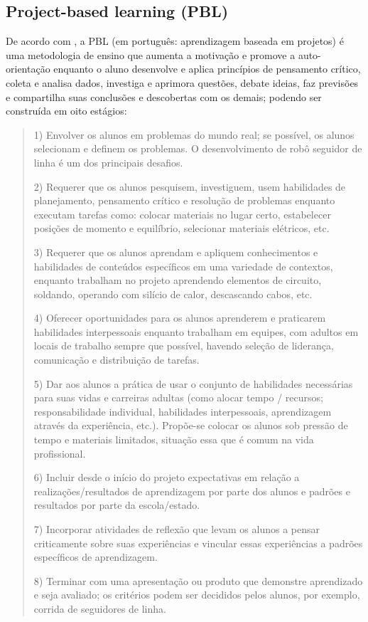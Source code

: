 \subsection{Project-based learning (PBL)}\label{sec:pbl} 
De acordo com \cite{karahoca}, a PBL (em português: aprendizagem baseada em projetos) é uma metodologia de ensino que aumenta a motivação e promove a auto-orientação enquanto o aluno desenvolve e aplica princípios de pensamento crítico, coleta e analisa dados, investiga e aprimora questões, debate ideias, faz previsões e compartilha suas conclusões e descobertas com os demais; podendo ser construída em oito estágios:
\begin{quote}
1) Envolver os alunos em problemas do mundo real; se possível, os alunos selecionam e definem os problemas. O desenvolvimento de robô seguidor de linha é um dos principais desafios.

2) Requerer que os alunos pesquisem, investiguem, usem habilidades de planejamento, pensamento crítico e resolução de problemas enquanto executam tarefas como: colocar materiais no lugar certo, estabelecer posições de momento e equilíbrio, selecionar materiais elétricos, etc.

3) Requerer que os alunos aprendam e apliquem conhecimentos e habilidades de conteúdos específicos em uma variedade de contextos, enquanto trabalham no projeto aprendendo elementos de circuito, soldando, operando com silício de calor, descascando cabos, etc.

4) Oferecer oportunidades para os alunos aprenderem e praticarem habilidades interpessoais enquanto trabalham em equipes, com adultos em locais de trabalho sempre que possível, havendo seleção de liderança, comunicação e distribuição de tarefas.

5) Dar aos alunos a prática de usar o conjunto de habilidades necessárias para suas vidas e carreiras adultas (como alocar tempo / recursos; responsabilidade individual, habilidades interpessoais, aprendizagem através da experiência, etc.). Propõe-se colocar os alunos sob pressão de tempo e materiais limitados, situação essa que  é comum na vida profissional.

6) Incluir desde o início do projeto expectativas em relação a realizações/resultados de aprendizagem por parte dos alunos e padrões e resultados por parte da escola/estado.

7) Incorporar atividades de reflexão que levam os alunos a pensar criticamente sobre suas experiências e vincular essas experiências a padrões específicos de aprendizagem.

8) Terminar com uma apresentação ou produto que demonstre aprendizado e seja avaliado; os critérios podem ser decididos pelos alunos, por exemplo, corrida de seguidores de linha. \end{quote}

